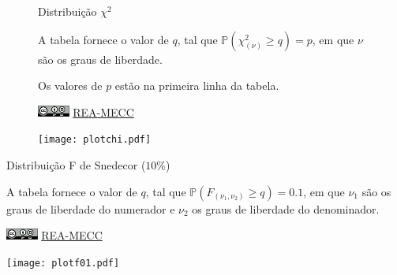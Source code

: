 \documentclass[a4paper,12pt]{article}
\begin{document}
\newpage


\begin{landscape}

\begin{figure}[h]
\begin{minipage}[c]{1\textwidth}

\begin{Huge}
Distribuição $\chi^2$
\end{Huge}

\vspace{2em}

A tabela fornece o valor de $q$, tal que $\mathbb{P}(\chi^2_{(\nu)} \geq q) = p$, em que $\nu$ são os graus de liberdade.

Os valores de $p$ estão na primeira linha da tabela.
\par\bigskip
\href{https://creativecommons.org/licenses/by-sa/4.0/deed.pt_BR}{\includegraphics[height=1em]{cc-by-sa.pdf}}
\href{https://rea-mecc.github.io}{REA-MECC}
\end{minipage}
\hfill
\begin{minipage}[c]{.30\textwidth}
\texttt{[image: plotchi.pdf]}
\end{minipage}
\end{figure}  



\end{landscape}


\newpage


\renewcommand{\arraystretch}{1.12}
\setlength\tabcolsep{.45em}


\begin{landscape}

\begin{minipage}[l]{1\textwidth}
\begin{Huge}
Distribuição F de Snedecor ($10\%$)
\end{Huge}
\par
\vspace{2em}
A tabela fornece o valor de $q$, tal que $\mathbb{P}(F_{(\nu_1, \nu_2)} \geq q) = 0.1$, em que $\nu_1$ são os graus de liberdade do numerador e $\nu_2$ os graus de liberdade do denominador. 
\par\bigskip
\href{https://creativecommons.org/licenses/by-sa/4.0/deed.pt_BR}{\includegraphics[height=1em]{cc-by-sa.pdf}}
\href{https://rea-mecc.github.io}{REA-MECC}
\end{minipage}
\hfill
\begin{minipage}[c]{.35\textwidth}
\texttt{[image: plotf01.pdf]}
\end{minipage}



\end{landscape}
\end{document}

